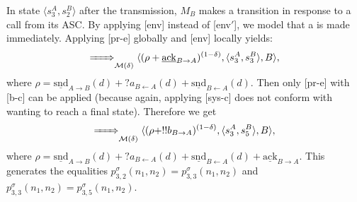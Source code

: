 \documentclass{sig-alternate}
\renewcommand{\d}{\delta}
\newcommand{\locev}[1]{\underline{#1}}
\newcommand{\snd}{\mathrm{snd}}
\newcommand{\ack}{\mathrm{ack}}
\newcommand{\env}[4]{\locev{#1}_{{#2} \rightarrow {#3}}(#4)}
\newcommand{\eenv}[3]{\locev{#1}_{{#2} \rightarrow {#3}}}
\newcommand{\sys}[4]{\locev{#1}_{{#2} \leftarrow {#3}}(#4)}
\begin{document}
In state $\langle s^A_3, s^B_2 \rangle$ after the transmission, $M_B$ makes a transition in response to a call from its ASC. By applying [env] instead of [env$'$], we model that a is made immediately. Applying [pr-e] globally and [env] locally yields:
\begin{equation*}
	\bigstep{} \langle (\rho + \eenv{\ack}{B}{A})^{(1 - \d)}, \langle s^A_3, s^B_3 \rangle, B \rangle,
\end{equation*}
where $\rho = \env{\snd}{A}{B}{d} + ?a_{B \leftarrow A}(d) + \sys{\snd}{B}{A}{d}$. Then only [pr-e] with [b-c] can be applied (because again, applying [sys-c] does not conform with wanting to reach a final state). Therefore we get
\begin{equation}
	\bigstep{} \langle (\rho + !!b_{B \rightarrow A})^{(1 - \d)}, \langle s^A_3, s^B_5 \rangle, B \rangle,
	\label{eq:35}
\end{equation}
where $\rho = \env{\snd}{A}{B}{d} + ?a_{B \leftarrow A}(d) + \sys{\snd}{B}{A}{d} + \eenv{\ack}{B}{A}$. This generates the equalities $p^{\sigma}_{3, 2}(n_1, n_2) = p^{\sigma}_{3, 3}(n_1, n_2)$ and $p^{\sigma}_{3, 3}(n_1, n_2) = p^{\sigma}_{3, 5}(n_1, n_2)$.
\end{document}
